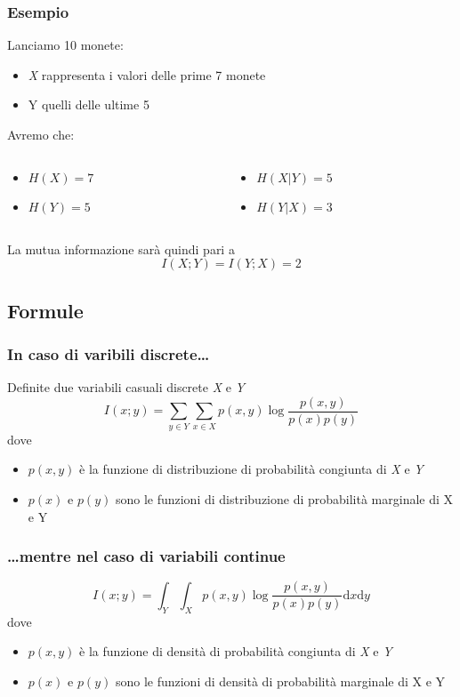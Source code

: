 \documentclass{beamer}
\begin{document}
\begin{frame}
	\frametitle{Esempio}
	Lanciamo 10 monete:
	\begin{itemize}
		\item \emph{X} rappresenta i valori delle prime 7 monete
		\item Y quelli delle ultime 5
	\end{itemize}
	Avremo che:
	\begin{columns}
		\begin{column}{0.5\textwidth}
			\begin{itemize}
				\item $H(X) = 7$
				\item $H(Y) = 5$\newline
			\end{itemize}
		\end{column}
		\begin{column}{0.5\textwidth}
			\begin{itemize}
				\item $H(X|Y) = 5$
				\item $H(Y|X) = 3$\newline
			\end{itemize}
		\end{column}
	\end{columns}
	La mutua informazione sarà quindi pari a
$$I(X; Y ) = I(Y ; X) = 2 $$
\end{frame}
\subsection{Formule}
\begin{frame}
	\frametitle{In caso di varibili discrete\dots}
	Definite due variabili casuali discrete \emph{X} e \emph{Y}
	$$ I (x;y) = \sum\limits_{y \in Y} \sum\limits_{x \in X} p(x,y)\log \frac{p(x,y)}{p(x)p(y)}$$
	dove
	\begin{itemize}
		\item $p(x,y)$ è la funzione di distribuzione di probabilità congiunta di \emph{X} e \emph{Y}
		\item $p(x)$ e $p(y)$ sono le funzioni di distribuzione di probabilità marginale di X e Y
	\end{itemize}
\end{frame}
\begin{frame}
	\frametitle{\dots mentre nel caso di variabili continue}
	$$ I (x;y) = \int_Y \int_X p(x,y)\log \frac{p(x,y)}{p(x)p(y)} \mathrm{d}x \mathrm{d}y$$
	dove
	\begin{itemize}
		\item $p(x,y)$ è la funzione di densità di probabilità congiunta di \emph{X} e \emph{Y}
		\item $p(x)$ e $p(y)$ sono le funzioni di densità di probabilità marginale di X e Y
	\end{itemize}
\end{frame}
\end{document}
